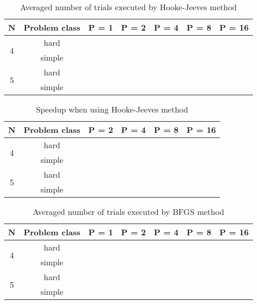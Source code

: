 \documentclass[runningheads]{llncs}
\begin{document}
\begin{table}[ht]
	\caption{Averaged number of trials executed by Hooke-Jeeves method}
	\label{tab:6}
	\center
	\begin{tabular}{|c|c|c|c|c|c|c|}
		\hline
		N & Problem class & P = 1 & P = 2 & P = 4 & P = 8 & P = 16 \\
		\hline 
		    \multirow{2}{*}{4} & hard &  &  &  &  &  \\ \cline{2-7}
		                       & simple &  &  &  &  &  \\
		\hline
		    \multirow{2}{*}{5} & hard &  &  &  &  &  \\ \cline{2-7}
		                       & simple &  &  &  &  &  \\
		\hline
	\end{tabular}
\end{table}

\begin{table}[ht]
	\caption{Speedup when using Hooke-Jeeves method}
	\label{tab:7}
	\center
	\begin{tabular}{|c|c|c|c|c|c|}
		\hline
		N & Problem class  & P = 2 & P = 4 & P = 8 & P = 16 \\
		\hline 
		    \multirow{2}{*}{4} & hard &  &  &  &  \\ \cline{2-6}
		                       & simple &  &  &  &  \\
		\hline
		    \multirow{2}{*}{5} & hard &  &  &  &  \\ \cline{2-6}
		                       & simple &  &  &  &  \\
		\hline
	\end{tabular}
\end{table}


\begin{table}[ht]
	\caption{Averaged number of trials executed by BFGS method}
	\label{tab:8}
	\center
	\begin{tabular}{|c|c|c|c|c|c|c|}
		\hline
		N & Problem class & P = 1 & P = 2 & P = 4 & P = 8 & P = 16 \\
		\hline 
		    \multirow{2}{*}{4} & hard &  &  &  &  &  \\ \cline{2-7}
		                       & simple &  &  &  &  &  \\
		\hline
		    \multirow{2}{*}{5} & hard &  &  &  &  &  \\ \cline{2-7}
		                       & simple &  &  &  &  &  \\
		\hline
	\end{tabular}
\end{table}
\end{document}
